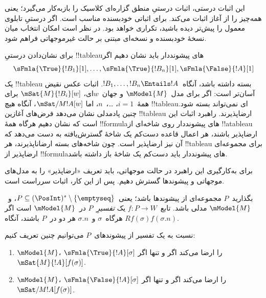 \documentclass[../../../include/open-logic-section]{subfiles}
\begin{document}


\begin{editorial}
  این اثبات درستی، اثبات درستیِ منطق گزاره‌ای کلاسیک را بازبه‌کار
  می‌گیرد؛ یعنی همه‌چیز را از آغاز اثبات می‌کند. برای اثباتی
  خودبسنده مناسب است. اگر درستیِ تابلوی معمول را پیش‌تر دیده باشید،
  تکراری خواهد بود. در نظر است امکان انتخاب میان نسخهٔ خودبسنده و
  نسخه‌ای مبتنی بر حالت غیرموجهاتی فراهم شود.
\end{editorial}

\begin{explain}
  برای نشان‌دادن درستیِ !!{tableau}های پیشونددار باید نشان دهیم اگر
  \[
  \sFmla{\True}{!B_1}[1], \dots, \sFmla{\True}{!B_n}[1], \sFmla{\False}{!A}[1]
  \]
  یک !!{tableau} بسته داشته باشد، آنگاه~$!B_1, \dots, !B_n \Entails
  !A$. اثبات عکس نقیض آسان‌تر است: اگر برای مدل~$\mModel{M}$ و
  جهان~$w$ای، $\mSat{M}{!B_i}[w]$ برای همهٔ~$i=1$، \dots،~$n$، اما
  $\mSat/{M}{!A}[w]$، آنگاه هیچ !!{tableau}ای نمی‌تواند بسته شود. چنین
  پادمدلی نشان می‌دهد فرض‌های آغازین !!{tableau} ارضاپذیرند. راهبرد
  اثبات این است که نشان دهیم هرگاه همهٔ !!{formula}های پیشونددار روی
  شاخه‌ای از !!a{tableau} ارضاپذیر باشند، هر اعمال قاعده دست‌کم یک
  شاخهٔ گسترش‌یافته به دست می‌دهد که آن نیز ارضاپذیر است. چون شاخه‌های
  بسته ارضاناپذیرند، هر !!{tableau} برای مجموعه‌ای ارضاپذیر از
  !!{formula}های پیشونددار باید دست‌کم یک شاخهٔ باز داشته باشد.

  برای به‌کارگیری این راهبرد در حالت موجهاتی، باید تعریف «ارضاپذیر» را
  به مدل‌های موجهاتی و پیشوندها گسترش دهیم. پس از این کار، اثبات
  سرراست است.
\end{explain}

\begin{defn}
  بگذارید~$P$ مجموعه‌ای از پیشوندها باشد؛ یعنی~$P \subseteq
  (\PosInt)^* \setminus \{\emptyseq\}$، و~$\mModel{M}$ مدلی باشد.
  تابع~$f\colon P \to W$ یک \emph{تفسیرِ}~$P$ در~$\mModel{M}$ است
  اگر هرگاه~$\sigma$ و~$\sigma.n$ هر دو در~$P$ باشند، آنگاه
  $Rf(\sigma)f(\sigma.n)$.

  نسبت به یک تفسیر از پیشوندهای~$P$ می‌توانیم چنین تعریف کنیم:
  \begin{enumerate}
  \item $\mModel{M}$، $\sFmla{\True}{!A}[\sigma]$ را ارضا می‌کند اگر
    و تنها اگر~$\mSat{M}{!A}[f(\sigma)]$.
  \item $\mModel{M}$، $\sFmla{\False}{!A}[\sigma]$ را ارضا می‌کند
    اگر و تنها اگر~$\mSat/{M}{!A}[f(\sigma)]$.
  \end{enumerate}
\end{defn}
\end{document}
